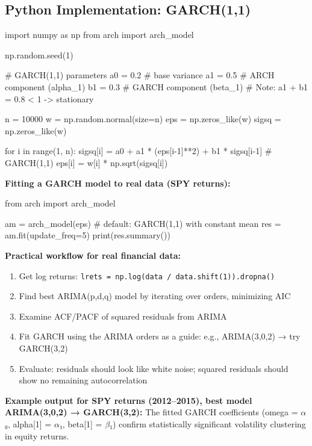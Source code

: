 \documentclass[12pt,openany]{book}
\theoremstyle{definition}
\theoremstyle{remark}
\begin{document}
\subsection{Python Implementation: GARCH(1,1)}
\begin{python}
import numpy as np
from arch import arch_model

np.random.seed(1)

# GARCH(1,1) parameters
a0 = 0.2   # base variance
a1 = 0.5   # ARCH component (alpha_1)
b1 = 0.3   # GARCH component (beta_1)
# Note: a1 + b1 = 0.8 < 1 -> stationary

n = 10000
w = np.random.normal(size=n)
eps = np.zeros_like(w)
sigsq = np.zeros_like(w)

for i in range(1, n):
    sigsq[i] = a0 + a1 * (eps[i-1]**2) + b1 * sigsq[i-1]  # GARCH(1,1)
    eps[i] = w[i] * np.sqrt(sigsq[i])
\end{python}
\textbf{Fitting a GARCH model to real data (SPY returns):}

\begin{python}
from arch import arch_model

am = arch_model(eps)      # default: GARCH(1,1) with constant mean
res = am.fit(update_freq=5)
print(res.summary())
\end{python}
\textbf{Practical workflow for real financial data:}

\begin{enumerate}
\item Get log returns: \texttt{lrets = np.log(data / data.shift(1)).dropna()}


\item Find best ARIMA(p,d,q) model by iterating over orders, minimizing AIC


\item Examine ACF/PACF of squared residuals from ARIMA


\item Fit GARCH using the ARIMA orders as a guide: e.g., ARIMA(3,0,2) → try GARCH(3,2)


\item Evaluate: residuals should look like white noise; squared residuals should show no remaining autocorrelation


\end{enumerate}
\textbf{Example output for SPY returns (2012--2015), best model ARIMA(3,0,2) → GARCH(3,2):} The fitted GARCH coefficients (omega = \(\alpha\)₀, alpha[1] = \(\alpha\)₁, beta[1] = \(\beta\)₁) confirm statistically significant volatility clustering in equity returns.
\end{document}
